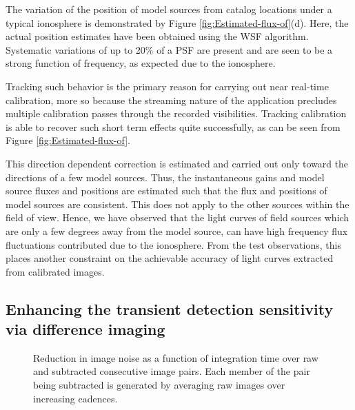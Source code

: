\documentclass{aa}
\begin{document}
The variation  of the position of  model sources from catalog  locations under a
typical  ionosphere is  demonstrated  by Figure  \ref{fig:Estimated-flux-of}(d).
Here,  the  actual   position  estimates  have  been  obtained   using  the  WSF
algorithm. Systematic variations of up to 20\% of a PSF are present and are seen
to be a strong function of frequency, as expected due to the ionosphere.

Tracking such  behavior is the primary  reason for carrying  out near real-time
calibration, more so  because the streaming nature of  the application precludes
multiple  calibration   passes  through  the   recorded  visibilities.  Tracking
calibration is  able to recover such  short term effects  quite successfully, as
can be seen from Figure \ref{fig:Estimated-flux-of}.

This direction dependent correction is estimated and carried out only toward the
directions  of a  few model  sources. Thus,  the instantaneous  gains  and model
source fluxes  and positions are estimated  such that the flux  and positions of
model sources  are consistent. This does  not apply to the  other sources within
the  field of  view. Hence,  we have  observed that  the light  curves  of field
sources which are  only a few degrees  away from the model source,  can have high
frequency flux  fluctuations contributed  due to the  ionosphere. From  the test
observations, this places another constraint on the achievable accuracy of light
curves extracted from calibrated images.


\subsection{\label{sub:Enhancing-the-transient}Enhancing the transient detection
sensitivity via difference imaging} 

\begin{figure}[h]
\caption{\label{fig:Reduction-in-image}Reduction in image noise as a function of
  integration  time over  raw  and subtracted  consecutive  image pairs.   Each
  member of the pair being subtracted is generated by averaging raw images over
  increasing  cadences.}
\end{figure}
\end{document}
